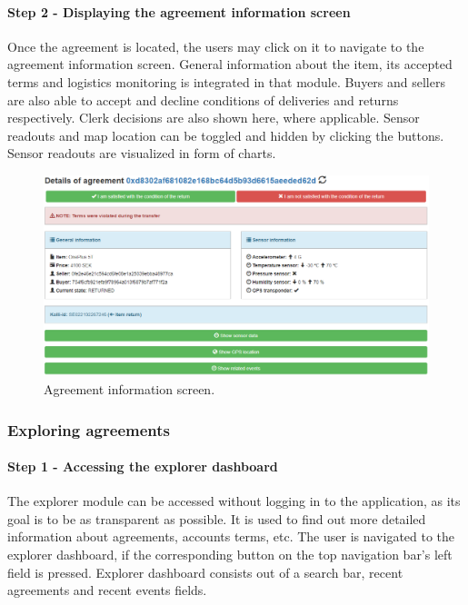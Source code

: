 \paragraph{Step 2 - Displaying the agreement information screen}
Once the agreement is located, the users may click on it to navigate to the agreement information screen. General information about the item, its accepted terms and logistics monitoring is integrated in that module. Buyers and sellers are also able to accept and decline conditions of deliveries and returns respectively. Clerk decisions are also shown here, where applicable. Sensor readouts and map location can be toggled and hidden by clicking the buttons. Sensor readouts are visualized in form of charts. 

\begin{figure}[H]
\centering
\includegraphics[scale=0.485]{app_screens/agreement_display.png}
\caption{Agreement information screen.}
\label{fig:agreementdisplay}
\end{figure}

\subsubsection{Exploring agreements}

\paragraph{Step 1 - Accessing the explorer dashboard}
The explorer module can be accessed without logging in to the application, as its goal is to be as transparent as possible. It is used to find out more detailed information about agreements, accounts terms, etc. The user is navigated to the explorer dashboard, if the corresponding button on the top navigation bar's left field is pressed. Explorer dashboard consists out of a search bar, recent agreements and recent events fields.


